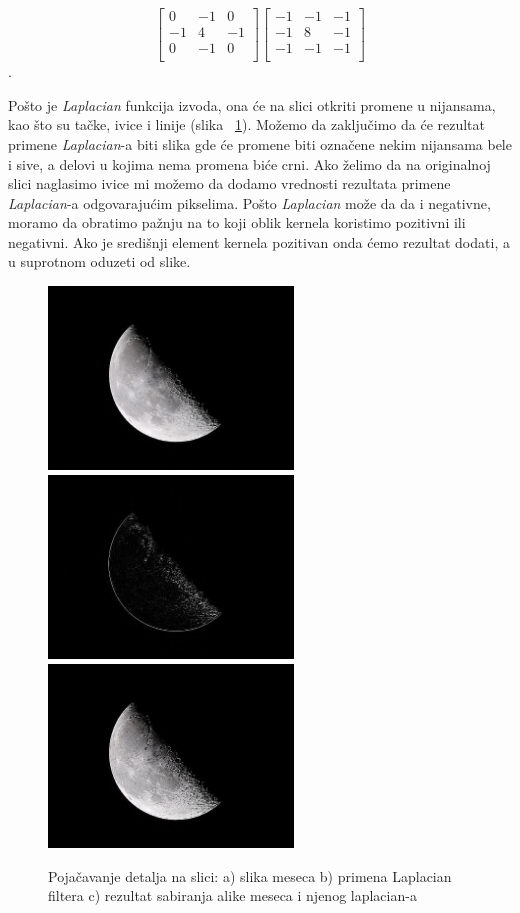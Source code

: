 \documentclass[a4paper,12pt,titlepage]{article}
\begin{document}
\[
\begin{bmatrix}
0 & -1 & 0 \\
-1 & 4 & -1 \\
0 & -1 & 0 \\
\end{bmatrix}
\begin{bmatrix}
-1 & -1 & -1 \\
-1 & 8 & -1 \\
-1 & -1 & -1 \\
\end{bmatrix}
\]. 

Pošto je \emph{Laplacian} funkcija izvoda, ona će na slici otkriti promene u nijansama, kao što su tačke, ivice i linije (slika ~\ref{mesec}). Možemo da zaključimo da će rezultat primene \emph{Laplacian}-a biti slika gde će promene biti označene nekim nijansama bele i sive, a delovi u kojima nema promena biće crni. Ako želimo da na originalnoj slici naglasimo ivice mi možemo da dodamo vrednosti rezultata primene \emph{Laplacian}-a odgovarajućim pikselima. Pošto \emph{Laplacian} može da da i negativne, moramo da obratimo pažnju na to koji oblik kernela koristimo pozitivni ili negativni. Ako je središnji element kernela pozitivan onda ćemo rezultat dodati, a u suprotnom oduzeti od slike.

\begin{figure}[ht!]
\centering
\includegraphics[width=65mm]{img/moon.jpg}
\includegraphics[width=65mm]{img/moonLap.jpg}
\includegraphics[width=65mm]{img/moonEn.jpg}
\caption{Pojačavanje detalja na slici: a) slika meseca b) primena Laplacian filtera c) rezultat sabiranja alike meseca i njenog laplacian-a}
\label{mesec}
\end{figure}
\end{document}
